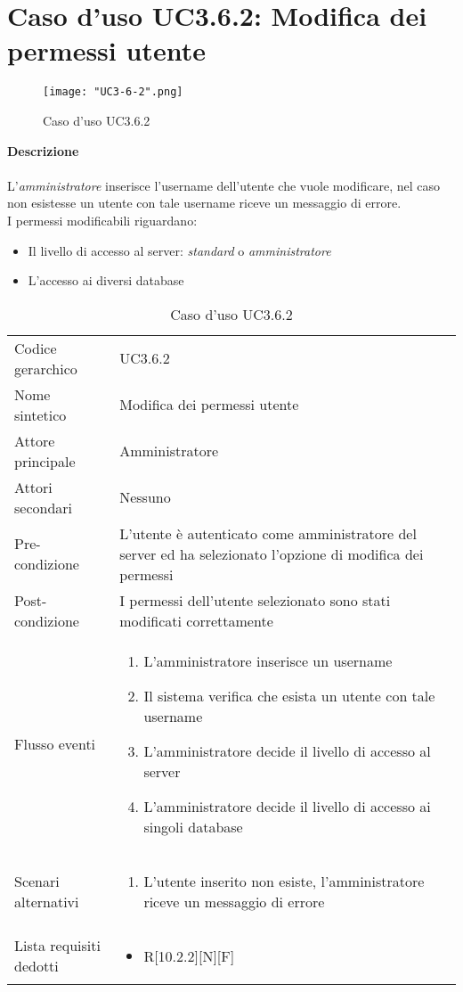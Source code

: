 \documentclass[a4paper]{report}
\begin{document}
	 \section{Caso d'uso UC3.6.2: Modifica dei permessi utente}
	 \begin{figure}[H]
			\centering
			\texttt{[image: "UC3-6-2".png]}
			\caption{Caso d'uso UC3.6.2}
		\end{figure}
	 \textbf{Descrizione} \\ \\
	 L'\emph{amministratore} inserisce l'username dell'utente che vuole modificare, nel caso non esistesse
	  un utente con tale username riceve un messaggio di errore. \\
	 I permessi modificabili riguardano:
	 \begin{itemize}
	 	\item Il livello di accesso al server: \emph{standard} o \emph{amministratore}
	 	\item L'accesso ai diversi database
	 \end{itemize}
		\begin{table}[H]
		\begin{tabularx}{\textwidth}{X | X}\toprule
			\rowcolor{orange!65}Codice gerarchico & UC3.6.2 \\
			Nome sintetico & Modifica dei permessi utente \\
			\rowcolor{orange!65}Attore principale & Amministratore\\
			Attori secondari & Nessuno \\
			\rowcolor{orange!65}Pre-condizione & L'utente è autenticato come amministratore del server ed
			 ha selezionato l'opzione di modifica dei permessi\\
			Post-condizione & I permessi dell'utente selezionato sono stati modificati correttamente \\
			\rowcolor{orange!65}Flusso eventi & \begin{enumerate}
			\item L'amministratore inserisce un username
			\item Il sistema verifica che esista un utente con tale username
			\item L'amministratore decide il livello di accesso al server
			\item L'amministratore decide il livello di accesso ai singoli database
			\end{enumerate} \\
			Scenari alternativi & \begin{enumerate}
			\item L'utente inserito non esiste, l'amministratore riceve un messaggio di errore
			\end{enumerate} \\
			\rowcolor{orange!65}Lista requisiti dedotti & \begin{itemize}
				\item R[10.2.2][N][F]
				\end{itemize} \\
			\bottomrule
		\end{tabularx}
		\caption{Caso d'uso UC3.6.2}
	 \end{table}
\end{document}
